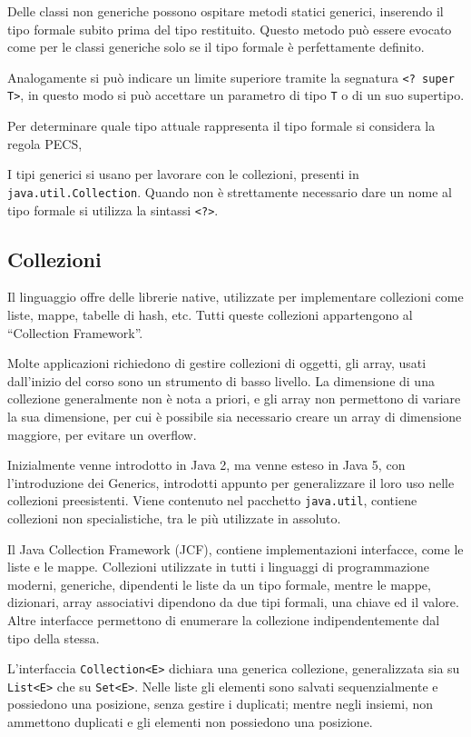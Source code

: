 \documentclass{article}
\numberwithin{equation}{subsection}
\begin{document}
Delle classi non generiche possono ospitare metodi statici generici, inserendo il tipo formale subito prima del tipo restituito. Questo metodo può essere evocato 
come per le classi generiche solo se il tipo formale è perfettamente definito. 

Analogamente si può indicare un limite superiore tramite la segnatura \verb|<? super T>|, in questo modo si può accettare un parametro di tipo \verb|T| o di un suo 
supertipo. 

Per determinare quale tipo attuale rappresenta il tipo formale si considera la regola PECS, %

I tipi generici si usano per lavorare con le collezioni, presenti in \verb|java.util.Collection|. 
Quando non è strettamente necessario dare un nome al tipo formale si utilizza la sintassi \verb|<?>|. 


\subsection{Collezioni}

Il linguaggio offre delle librerie native, utilizzate per implementare collezioni come liste, mappe, tabelle di hash, etc. 
Tutti queste collezioni appartengono al ``Collection Framework''. 


Molte applicazioni richiedono di gestire collezioni di oggetti, gli array, usati dall'inizio del corso sono un strumento di basso livello. La dimensione di una collezione 
generalmente non è nota a priori, e gli array non permettono di variare la sua dimensione, per cui è possibile sia necessario creare un array di dimensione maggiore, per 
evitare un overflow. 

Inizialmente venne introdotto in Java 2, ma venne esteso in Java 5, con l'introduzione dei Generics, introdotti appunto per generalizzare il loro uso nelle collezioni 
preesistenti. 
Viene contenuto nel pacchetto \verb|java.util|, contiene collezioni non specialistiche, tra le più utilizzate in assoluto. 

Il Java Collection Framework (JCF), contiene implementazioni interfacce, come le liste e le mappe. Collezioni utilizzate in tutti i linguaggi di programmazione moderni, 
generiche, dipendenti le liste da un tipo formale, mentre le mappe, dizionari, array associativi dipendono da due tipi formali, una chiave ed il valore. 
Altre interfacce permettono di enumerare la collezione indipendentemente dal tipo della stessa. 

L'interfaccia \verb|Collection<E>| dichiara una generica collezione, generalizzata sia su \verb|List<E>| che su \verb|Set<E>|. Nelle liste gli elementi sono salvati sequenzialmente 
e possiedono una posizione, senza gestire i duplicati; mentre negli insiemi, non ammettono duplicati e gli elementi non possiedono una posizione. 
\end{document}
